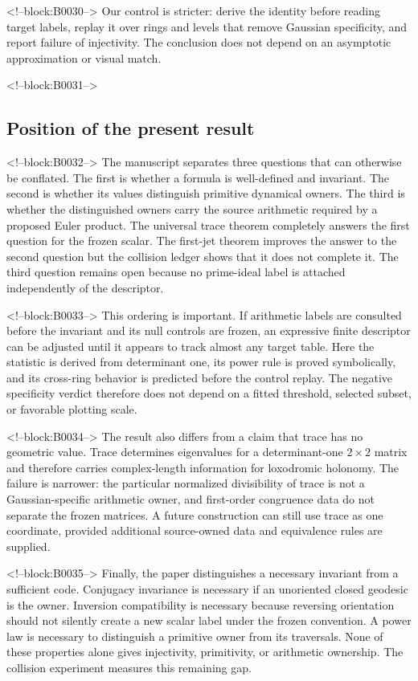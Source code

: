 \documentclass[11pt,a4paper]{article}
\theoremstyle{definition}
\theoremstyle{remark}
\begin{document}
<!--block:B0030-->
Our control is stricter: derive the identity before reading target labels, replay it over rings and levels that remove Gaussian specificity, and report failure of injectivity. The conclusion does not depend on an asymptotic approximation or visual match.

<!--block:B0031-->
\subsection{Position of the present result}

<!--block:B0032-->
The manuscript separates three questions that can otherwise be conflated. The first is whether a formula is well-defined and invariant. The second is whether its values distinguish primitive dynamical owners. The third is whether the distinguished owners carry the source arithmetic required by a proposed Euler product. The universal trace theorem completely answers the first question for the frozen scalar. The first-jet theorem improves the answer to the second question but the collision ledger shows that it does not complete it. The third question remains open because no prime-ideal label is attached independently of the descriptor.

<!--block:B0033-->
This ordering is important. If arithmetic labels are consulted before the invariant and its null controls are frozen, an expressive finite descriptor can be adjusted until it appears to track almost any target table. Here the statistic is derived from determinant one, its power rule is proved symbolically, and its cross-ring behavior is predicted before the control replay. The negative specificity verdict therefore does not depend on a fitted threshold, selected subset, or favorable plotting scale.

<!--block:B0034-->
The result also differs from a claim that trace has no geometric value. Trace determines eigenvalues for a determinant-one \(2\times2\) matrix and therefore carries complex-length information for loxodromic holonomy. The failure is narrower: the particular normalized divisibility of trace is not a Gaussian-specific arithmetic owner, and first-order congruence data do not separate the frozen matrices. A future construction can still use trace as one coordinate, provided additional source-owned data and equivalence rules are supplied.

<!--block:B0035-->
Finally, the paper distinguishes a necessary invariant from a sufficient code. Conjugacy invariance is necessary if an unoriented closed geodesic is the owner. Inversion compatibility is necessary because reversing orientation should not silently create a new scalar label under the frozen convention. A power law is necessary to distinguish a primitive owner from its traversals. None of these properties alone gives injectivity, primitivity, or arithmetic ownership. The collision experiment measures this remaining gap.
\end{document}
